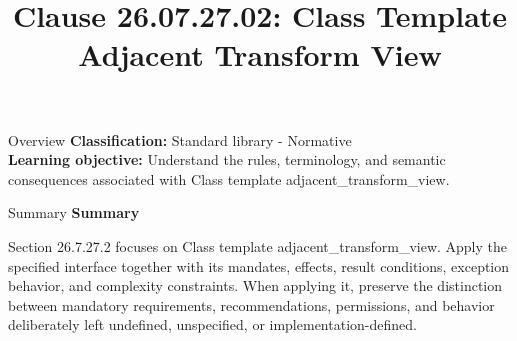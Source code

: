 \documentclass[10pt,letterpaper]{article}
\title{Clause 26.07.27.02: Class Template Adjacent Transform View}
\author{}
\date{}
\begin{document}
\maketitle
\begin{CornellOverviewBox}{Overview}
\textbf{Classification:} Standard library - Normative\\[2pt]
\textbf{Learning objective:} Understand the rules, terminology, and semantic consequences associated with Class template adjacent\_transform\_view.
\end{CornellOverviewBox}\begin{CornellSummaryBox}{Summary}
{\sffamily\bfseries\color{Accent} Summary}\par\vspace{3pt}Section 26.7.27.2 focuses on Class template adjacent\_transform\_view. Apply the specified interface together with its mandates, effects, result conditions, exception behavior, and complexity constraints. When applying it, preserve the distinction between mandatory requirements, recommendations, permissions, and behavior deliberately left undefined, unspecified, or implementation-defined.
\end{CornellSummaryBox}
\end{document}

